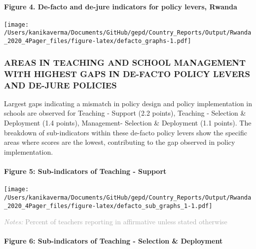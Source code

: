 \documentclass[twocolumn]{article}
\let\oldparagraph\paragraph
\renewcommand{\paragraph}[1]{\oldparagraph{#1}\mbox{}}
\begin{document}
\hypertarget{figure-4.-de-facto-and-de-jure-indicators-for-policy-levers-rwanda}{%
\paragraph{Figure 4. De-facto and de-jure indicators for policy levers,
Rwanda}\label{figure-4.-de-facto-and-de-jure-indicators-for-policy-levers-rwanda}}

\texttt{[image: /Users/kanikaverma/Documents/GitHub/gepd/Country\_Reports/Output/Rwanda\_2020\_4Pager\_files/figure-latex/defacto\_graphs-1.pdf]}

\hypertarget{areas-in-teaching-and-school-management-with-highest-gaps-in-de-facto-policy-levers-and-de-jure-policies}{%
\subsubsection{\texorpdfstring{\textbf{AREAS IN TEACHING AND SCHOOL
MANAGEMENT WITH HIGHEST GAPS IN DE-FACTO POLICY LEVERS AND DE-JURE
POLICIES}}{AREAS IN TEACHING AND SCHOOL MANAGEMENT WITH HIGHEST GAPS IN DE-FACTO POLICY LEVERS AND DE-JURE POLICIES}}\label{areas-in-teaching-and-school-management-with-highest-gaps-in-de-facto-policy-levers-and-de-jure-policies}}

Largest gaps indicating a mismatch in policy design and policy
implementation in schools are observed for Teaching - Support (2.2
points), Teaching - Selection \& Deployment (1.4 points), Management-
Selection \& Deployment (1.1 points). The breakdown of sub-indicators
within these de-facto policy levers show the specific areas where scores
are the lowest, contributing to the gap observed in policy
implementation. \vfill\null

\hypertarget{figure-5-sub-indicators-of-teaching---support}{%
\paragraph{Figure 5: Sub-indicators of Teaching -
Support}\label{figure-5-sub-indicators-of-teaching---support}}

\texttt{[image: /Users/kanikaverma/Documents/GitHub/gepd/Country\_Reports/Output/Rwanda\_2020\_4Pager\_files/figure-latex/defacto\_sub\_graphs\_1-1.pdf]}

{\scriptsize
    \textcolor{darkgray}{\textit{Notes:} Percent of teachers reporting in affirmative unless stated otherwise}
  }

\hypertarget{figure-6-sub-indicators-of-teaching---selection-deployment}{%
\paragraph{Figure 6: Sub-indicators of Teaching - Selection \&
Deployment}\label{figure-6-sub-indicators-of-teaching---selection-deployment}}
\end{document}
